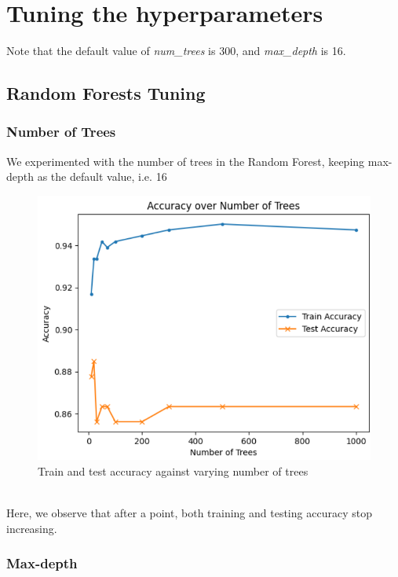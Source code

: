 \section{Tuning the hyperparameters}
Note that the default value of \textit{num\_trees} is 300, and \textit{max\_depth} is 16.
\subsection{Random Forests Tuning}
\subsubsection{Number of Trees}
We experimented with the number of trees in the Random Forest, keeping max-depth as the default value, i.e. 16\\
\begin{figure}[htbp]
    \centering
    \includegraphics[width=0.8\linewidth]{images/rf_acc_num_trees.png}
    \caption*{Train and test accuracy against varying number of trees}
    \label{fig:your_label}
\end{figure}\\
Here, we observe that after a point, both training and testing accuracy stop increasing.
\newpage
\subsubsection{Max-depth}

